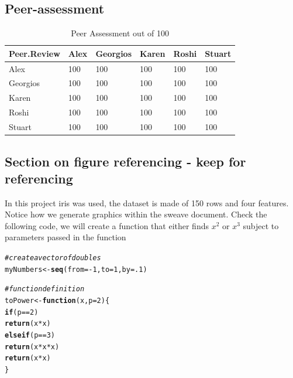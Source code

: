\documentclass[10pt]{article}\usepackage[]{graphicx}\usepackage[]{color}
\makeatletter
\newcommand{\hlnum}[1]{\textcolor[rgb]{0.686,0.059,0.569}{#1}}%
\newcommand{\hlcom}[1]{\textcolor[rgb]{0.678,0.584,0.686}{\textit{#1}}}%
\newcommand{\hlopt}[1]{\textcolor[rgb]{0,0,0}{#1}}%
\newcommand{\hlstd}[1]{\textcolor[rgb]{0.345,0.345,0.345}{#1}}%
\newcommand{\hlkwa}[1]{\textcolor[rgb]{0.161,0.373,0.58}{\textbf{#1}}}%
\newcommand{\hlkwb}[1]{\textcolor[rgb]{0.69,0.353,0.396}{#1}}%
\newcommand{\hlkwc}[1]{\textcolor[rgb]{0.333,0.667,0.333}{#1}}%
\newcommand{\hlkwd}[1]{\textcolor[rgb]{0.737,0.353,0.396}{\textbf{#1}}}%
\newenvironment{kframe}{%
 \def\at@end@of@kframe{}%
 \ifinner\ifhmode%
  \def\at@end@of@kframe{\end{minipage}}%
  \begin{minipage}{\columnwidth}%
 \fi\fi%
 \def\FrameCommand##1{\hskip\@totalleftmargin \hskip-\fboxsep
 \colorbox{shadecolor}{##1}\hskip-\fboxsep
     \hskip-\linewidth \hskip-\@totalleftmargin \hskip\columnwidth}%
 \MakeFramed {\advance\hsize-\width
   \@totalleftmargin\z@ \linewidth\hsize
   \@setminipage}}%
 {\par\unskip\endMakeFramed%
 \at@end@of@kframe}
\newenvironment{knitrout}{}{} %
\makeatother
\begin{document}
\begin{itemize}
\subsection{Peer-assessment}



\begin{table}[ht]
\centering
\caption{Peer Assessment out of 100} 
\label{tab:two}
\begin{tabular}{llllll}
  \hline
Peer.Review & Alex & Georgios & Karen & Roshi & Stuart \\ 
  \hline
Alex & 100 & 100 & 100 & 100 & 100 \\ 
  Georgios & 100 & 100 & 100 & 100 & 100 \\ 
  Karen & 100 & 100 & 100 & 100 & 100 \\ 
  Roshi & 100 & 100 & 100 & 100 & 100 \\ 
  Stuart & 100 & 100 & 100 & 100 & 100 \\ 
   \hline
\end{tabular}
\end{table}




\subsection{Section on figure referencing - keep for referencing}\label{explore}


In this project iris was used, the dataset is made of 150 rows and four features. \\

Notice how we generate graphics within the sweave document. Check the following code, we will create a function that either finds $x^2$ or $x^3$ subject to parameters passed in the function
\begin{knitrout}
\color{fgcolor}\begin{kframe}
\begin{alltt}
\hlcom{# create a vector of doubles}
\hlstd{myNumbers} \hlkwb{<-} \hlkwd{seq}\hlstd{(}\hlkwc{from}\hlstd{=}\hlopt{-}\hlnum{1}\hlstd{,}\hlkwc{to}\hlstd{=}\hlnum{1}\hlstd{,}\hlkwc{by}\hlstd{=}\hlnum{.1}\hlstd{)}

\hlcom{# function definition}
\hlstd{toPower} \hlkwb{<-} \hlkwa{function} \hlstd{(}\hlkwc{x}\hlstd{,}\hlkwc{p}\hlstd{=}\hlnum{2}\hlstd{) \{}
    \hlkwa{if} \hlstd{(p}\hlopt{==}\hlnum{2}\hlstd{)}
        \hlkwd{return} \hlstd{(x}\hlopt{*}\hlstd{x)}
    \hlkwa{else if} \hlstd{(p}\hlopt{==}\hlnum{3}\hlstd{)}
        \hlkwd{return} \hlstd{(x}\hlopt{*}\hlstd{x}\hlopt{*}\hlstd{x)}
    \hlkwd{return} \hlstd{(x}\hlopt{*}\hlstd{x)}
\hlstd{\}}


\end{alltt}
\end{kframe}
\end{knitrout}
\end{itemize}
\end{document}
